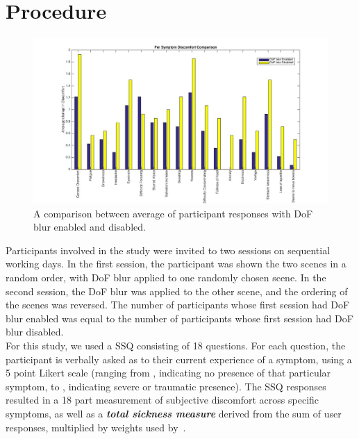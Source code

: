 \section{Procedure}

\begin{figure}[th]   
    \noindent
        \centering
            \includegraphics[width=\textwidth]{images/perSymptom.jpg}
            \caption{A comparison between average of participant responses with DoF blur enabled and disabled.}
            \label{fig:sicknessBreakdown}
\end{figure}


Participants involved in the study were invited to two sessions on sequential working days. In the first session, the participant was shown the two scenes in a random order, with DoF blur applied to one randomly chosen scene. In the second session, the DoF blur was applied to the other scene, and the ordering of the scenes was reversed. The number of participants whose first session had DoF blur enabled was equal to the number of participants whose first session had DoF blur disabled.\\

For this study, we used a SSQ consisting of 18 questions. For each question, the participant is verbally asked as to their current experience of a symptom, using a 5 point Likert scale (ranging from , indicating no presence of that particular symptom, to , indicating severe or traumatic presence). The SSQ responses resulted in a 18 part measurement of subjective discomfort across specific symptoms, as well as a \textbf{\textit{total sickness measure}} derived from the sum of user responses, multiplied by weights used by~\cite{kennedy93}.\\


